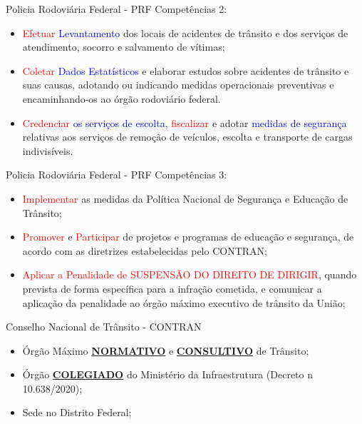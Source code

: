 \documentclass{beamer}
\begin{document}
\begin{frame}{Policia Rodoviária Federal - PRF}
Competências 2:
    \begin{itemize}
        \item \justifying \textcolor{red}{Efetuar} \textcolor{blue}{Levantamento} dos locais de acidentes de trânsito e dos serviços de atendimento, socorro e salvamento de vítimas;
        \item \justifying \textcolor{red}{Coletar} \textcolor{blue}{Dados Estatísticos} e elaborar estudos sobre acidentes de trânsito e suas causas, adotando ou indicando medidas operacionais preventivas e encaminhando-os ao órgão rodoviário federal.
        \item \justifying \textcolor{red}{Credenciar} \textcolor{blue}{os serviços de escolta}, \textcolor{red}{fiscalizar} e adotar \textcolor{blue}{medidas de segurança} relativas aos serviços de remoção de veículos, escolta e transporte de cargas indivisíveis.
    \end{itemize}
\end{frame}
\begin{frame}{Policia Rodoviária Federal - PRF}
Competências 3:
    \begin{itemize}
        \item \justifying \textcolor{red}{Implementar} as medidas da Política Nacional de Segurança e Educação de Trânsito;
        \item \justifying \textcolor{red}{Promover} e \textcolor{red}{Participar} de projetos e programas de educação e segurança, de acordo com as diretrizes estabelecidas pelo CONTRAN;
        \item \justifying \textcolor{red}{Aplicar a Penalidade de SUSPENSÃO DO DIREITO DE DIRIGIR}, quando prevista de forma específica para a infração cometida, e comunicar a aplicação da penalidade ao órgão máximo executivo de trânsito da União;
    \end{itemize}
\end{frame}
\begin{frame}{Conselho Nacional de Trânsito - CONTRAN}
    \begin{itemize}
        \item Órgão Máximo \textbf{\underline{NORMATIVO}} e \textbf{\underline{CONSULTIVO}} de Trânsito;
        \item \justifying Órgão \textbf{\underline{COLEGIADO}} do Ministério da Infraestrutura (Decreto n 10.638/2020);
        \item Sede no Distrito Federal;
    \end{itemize}
\end{frame}
\end{document}
